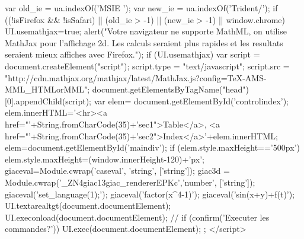 {{{  var old_ie = ua.indexOf('MSIE ');
  var new_ie = ua.indexOf('Trident/');
  if ((!isFirefox && !isSafari) || (old_ie > -1) || (new_ie > -1) || window.chrome){
     UI.usemathjax=true;
     alert("Votre navigateur ne supporte MathML, on utilise MathJax pour l'affichage 2d.  Les calculs seraient plus rapides et les resultats seraient mieux affiches avec Firefox.");
  }
  if (UI.usemathjax){
    var script = document.createElement("script");
    script.type = "text/javascript";
    script.src  = "http://cdn.mathjax.org/mathjax/latest/MathJax.js?config=TeX-AMS-MML_HTMLorMML";
    document.getElementsByTagName("head")[0].appendChild(script);
  }
  var elem= document.getElementById('controlindex');
  elem.innerHTML='<hr><a href="'+String.fromCharCode(35)+'sec1">Table</a>, <a href="'+String.fromCharCode(35)+'sec2">Index</a>'+elem.innerHTML;
  elem=document.getElementById('maindiv');
  if (elem.style.maxHeight=='500px')
    elem.style.maxHeight=(window.innerHeight-120)+'px';
  giaceval=Module.cwrap('caseval',  'string', ['string']);
  giac3d = Module.cwrap('_ZN4giac13giac_rendererEPKc','number', ['string']);
  giaceval('set_language(1);');
  giaceval('factor(x^4-1)');
  giaceval('sin(x+y)+f(t)');
  UI.textarealtgt(document.documentElement);
  UI.execonload(document.documentElement);
 // if (confirm('Executer les commandes?')) UI.exec(document.documentElement);
 };
</script>
}
\fi
}
\ifhevea
\newenvironment{giacprog}{
\verbatim}
{\endverbatim 
\@print{<button onclick="var field=parentNode.previousSibling; var tmp=field.innerHTML;if(tmp.length==0) tmp=field.value;var t=createElement('TEXTAREA');t.style.fontSize=16;t.cols=60;t.rows=10;var tmp1=UI.ltgt(tmp);t.value=tmp1;tmp=UI.caseval(tmp);tmp=UI.rmquote(tmp);nextSibling.innerHTML=tmp; UI.render_canvas(nextSibling.innerHTML); field.parentNode.insertBefore(t,field);field.parentNode.removeChild(field);">ok</button><span></span><br>
}
}
\newenvironment{giaconload}{
\verbatim}
{\endverbatim 
\@print{<button onclick="var field=parentNode.previousSibling; var tmp=field.innerHTML;if(tmp.length==0) tmp=field.value;var t=createElement('TEXTAREA');t.style.fontSize=16;t.cols=60;t.rows=UI.count_newline(tmp);var tmp1=UI.ltgt(tmp);t.value=tmp1;tmp=UI.caseval(tmp);tmp=UI.rmquote(tmp);nextSibling.innerHTML=tmp; UI.render_canvas(nextSibling.innerHTML); field.parentNode.insertBefore(t,field);field.parentNode.removeChild(field);">ok</button><span>onload</span><br>
}
}
\else
\newenvironment{giacprog}
{
\VerbatimEnvironment
\begin{Verbatim}
}
{
\end{Verbatim}
}
\newenvironment{giaconload}
{
\VerbatimEnvironment
\begin{Verbatim}
}
{
\end{Verbatim}
}
\fi

